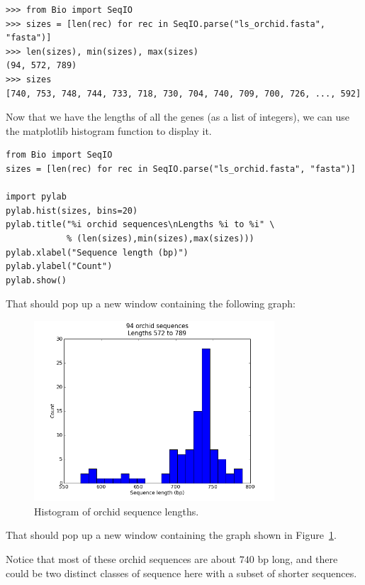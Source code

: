 \documentclass{report}
\begin{document}
\begin{verbatim}
>>> from Bio import SeqIO
>>> sizes = [len(rec) for rec in SeqIO.parse("ls_orchid.fasta", "fasta")]
>>> len(sizes), min(sizes), max(sizes)
(94, 572, 789)
>>> sizes
[740, 753, 748, 744, 733, 718, 730, 704, 740, 709, 700, 726, ..., 592]
\end{verbatim}

Now that we have the lengths of all the genes (as a list of integers), we can use the
matplotlib histogram function to display it.

\begin{verbatim}
from Bio import SeqIO
sizes = [len(rec) for rec in SeqIO.parse("ls_orchid.fasta", "fasta")]

import pylab
pylab.hist(sizes, bins=20)
pylab.title("%i orchid sequences\nLengths %i to %i" \
            % (len(sizes),min(sizes),max(sizes)))
pylab.xlabel("Sequence length (bp)")
pylab.ylabel("Count")
pylab.show()
\end{verbatim}

%
%
\begin{htmlonly}
\noindent That should pop up a new window containing the following graph:


\end{htmlonly}
%
%
\begin{latexonly}
\begin{figure}[htbp]
\centering
\includegraphics[width=0.8\textwidth]{images/hist_plot.png}
\caption{Histogram of orchid sequence lengths.}
\label{fig:seq-len-hist}
\end{figure}
\noindent That should pop up a new window containing the graph
shown in Figure~\ref{fig:seq-len-hist}.
\end{latexonly}
%
%
Notice that most of these orchid sequences are about $740$ bp long, and there could be
two distinct classes of sequence here with a subset of shorter sequences.
\end{document}
